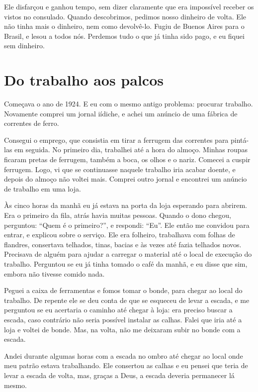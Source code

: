 Ele disfarçou e ganhou tempo, sem dizer claramente que era impossível
receber os vistos no consulado. Quando descobrimos, pedimos
nosso dinheiro de volta. Ele não tinha mais o dinheiro, nem como devolvê-lo. Fugiu de Buenos
Aires para o Brasil, e lesou a todos nós. Perdemos tudo o que já tinha
sido pago, e eu fiquei sem dinheiro.

\chapter{Do trabalho aos palcos}

Começava o ano de 1924. E eu com o mesmo antigo problema: procurar
trabalho. Novamente comprei um jornal iídiche, e achei um anúncio de uma
fábrica de correntes de ferro.

Consegui o emprego, que consistia em tirar a ferrugem das
correntes para pintá-las em seguida. No primeiro dia, trabalhei até a hora
do almoço. Minhas roupas ficaram pretas de ferrugem, também a boca,
os olhos e o nariz. Comecei a cuspir ferrugem. Logo, vi que se
continuasse naquele trabalho iria acabar doente, e depois do
almoço não voltei mais. Comprei outro jornal e encontrei um anúncio de trabalho em uma loja.

Às cinco horas da manhã eu já estava na porta da loja esperando para abrirem. Era o primeiro da fila, atrás havia muitas pessoas. Quando o dono chegou, perguntou: ``Quem é o primeiro?'', e respondi: ``Eu''. Ele então me
convidou para entrar, e explicou sobre o serviço. Ele era folheiro, trabalhava com folhas de flandres, consertava
telhados, tinas, bacias e às vezes até fazia telhados novos. Precisava de
alguém para ajudar a carregar o material até o local de execução do trabalho. Perguntou se eu já tinha tomado o café da manhã, e eu disse que sim, embora não tivesse comido nada.

Peguei a caixa de ferramentas e fomos tomar o bonde, para chegar ao 
local do trabalho. De repente ele se deu conta de que se esqueceu 
de levar a escada, e me perguntou se eu acertaria o caminho até 
chegar à loja: era preciso buscar a escada, caso contrário não 
seria possível instalar as calhas. Falei que iria até a loja e 
voltei de bonde. Mas, na volta, não me deixaram subir no bonde com a escada.

Andei durante algumas horas com a escada no ombro até chegar ao local
onde meu patrão estava trabalhando. Ele consertou as calhas e eu pensei
que teria de levar a escada de volta, mas, graças a Deus, a escada deveria
permanecer lá mesmo.

